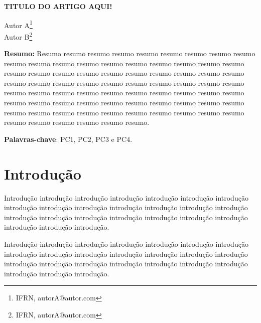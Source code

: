 \documentclass[article,12pt,oneside,a4paper,english,brazil,sumario=tradicional]{abntex2}
\begin{document}
\frenchspacing %

\begin{center}
	\uppercase{\bfseries{Titulo do Artigo Aqui!}}
	\vspace{12pt}
\end{center}

\begin{flushright}
	Autor A\footnote{IFRN, autorA@autor.com}
	\\
	Autor B\footnote{IFRN, autorA@autor.com}
	\vspace{12pt}
\end{flushright}

\begin{footnotesize}
\SingleSpacing
\noindent
\small{\textbf{Resumo:}}
\noindent
\small
Resumo resumo resumo resumo resumo resumo resumo resumo resumo resumo resumo resumo resumo resumo resumo resumo resumo resumo resumo resumo resumo resumo resumo resumo resumo resumo resumo resumo resumo resumo resumo resumo resumo resumo resumo resumo resumo resumo resumo resumo resumo resumo resumo resumo resumo resumo resumo resumo resumo resumo resumo resumo resumo resumo resumo resumo resumo resumo resumo resumo resumo resumo resumo resumo resumo resumo resumo resumo resumo resumo resumo resumo resumo resumo resumo.

\noindent
\textbf{Palavras-chave}: PC1, PC2, PC3 e PC4.
\end{footnotesize}

\textual
\pagestyle{simple}


\section{Introdu\c c\~ao}
\label{secIntroducao}
\normalsize
Introdu\c c\~ao introdu\c c\~ao introdu\c c\~ao introdu\c c\~ao introdu\c c\~ao introdu\c c\~ao introdu\c c\~ao introdu\c c\~ao introdu\c c\~ao introdu\c c\~ao introdu\c c\~ao introdu\c c\~ao introdu\c c\~ao introdu\c c\~ao introdu\c c\~ao introdu\c c\~ao introdu\c c\~ao introdu\c c\~ao introdu\c c\~ao introdu\c c\~ao introdu\c c\~ao introdu\c c\~ao introdu\c c\~ao introdu\c c\~ao.

Introdu\c c\~ao introdu\c c\~ao introdu\c c\~ao introdu\c c\~ao introdu\c c\~ao introdu\c c\~ao introdu\c c\~ao introdu\c c\~ao introdu\c c\~ao introdu\c c\~ao introdu\c c\~ao introdu\c c\~ao introdu\c c\~ao introdu\c c\~ao introdu\c c\~ao introdu\c c\~ao introdu\c c\~ao introdu\c c\~ao introdu\c c\~ao introdu\c c\~ao introdu\c c\~ao introdu\c c\~ao introdu\c c\~ao introdu\c c\~ao.
\end{document}
